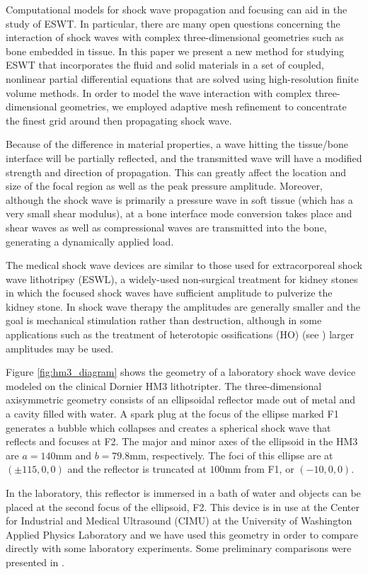 \documentclass{article}
\begin{document}
Computational models for shock wave propagation and focusing can
aid in the study of ESWT.  
In particular, there are many open
questions concerning the interaction of shock waves with complex
three-dimensional geometries such as bone embedded in tissue.  In this paper we present a new method for studying ESWT that incorporates the fluid and solid materials in a set of coupled, nonlinear partial differential equations that are solved using high-resolution finite volume methods.  In order to model the wave interaction with complex three-dimensional geometries, we employed adaptive mesh refinement to concentrate the finest grid around then propagating shock wave.  

Because of the difference in material properties, a wave hitting
the tissue/bone interface will be partially reflected, and the
transmitted wave will have a modified strength and direction of
propagation.  This can greatly affect the location and size of the
focal region as well as the peak pressure amplitude.  Moreover,
although the shock wave is primarily a pressure wave in soft tissue
(which has a very small shear modulus), at a bone interface 
mode conversion takes place and shear waves as well as compressional
waves are transmitted into the bone, generating a dynamically applied load.

The medical shock wave devices
are similar to those used for extracorporeal shock
wave lithotripsy (ESWL), a widely-used non-surgical treatment for
kidney stones in which the focused shock waves have sufficient
amplitude to pulverize the kidney stone.  In shock wave therapy the
amplitudes are generally smaller and the goal is mechanical stimulation
rather than destruction, although in some applications such as the
treatment of heterotopic ossifications (HO) (see ) larger
amplitudes may be used.

Figure \ref{fig:hm3_diagram} shows the geometry of a laboratory
shock wave device 
modeled on the clinical Dornier HM3 lithotripter.  The three-dimensional
axisymmetric geometry consists of an ellipsoidal reflector made out
of metal and a cavity filled with water.  A spark plug at the focus
of the ellipse marked F1 generates a bubble which collapses and
creates a spherical shock wave that reflects and focuses at F2.  
The major and minor axes of the
ellipsoid in the HM3 are $a=140$mm and $b=79.8$mm, respectively.
The foci of this ellipse are at $(\pm 115, 0, 0)$ and the reflector
is truncated at $100$mm from F1, or $(-10,0,0)$.  

In the laboratory, this reflector is immersed in a bath of water
and objects can be
placed at the second focus of the ellipsoid, F2.
This device is in use at the Center for Industrial and Medical Ultrasound
(CIMU) at the University of Washington Applied Physics Laboratory and we
have used this geometry in order to compare directly with some laboratory
experiments.  Some preliminary comparisons were presented in 
\cite{kfagnan_hyp06}.
\end{document}
